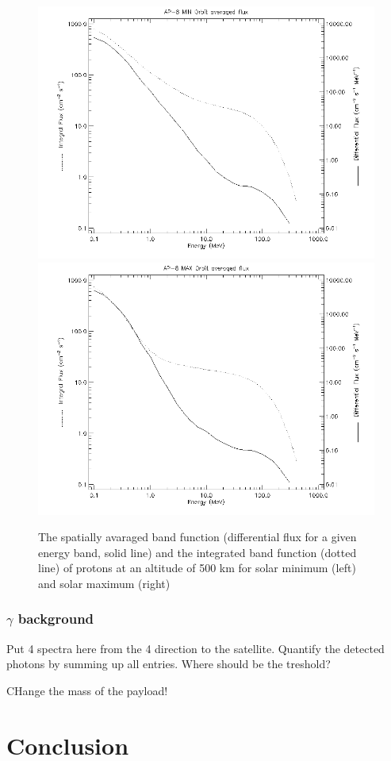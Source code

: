 \documentclass[12pt, a4paper,titlepage]{article}
\numberwithin{equation}{section}
\numberwithin{figure}{section}
\begin{document}
\begin{figure}[htbp]
 \centering %
 \includegraphics[width=.45\textwidth,origin=c,angle=0]{images/alt_500km_AP-8_MIN_averaged_spectra.png}
 \qquad
 \includegraphics[width=.45\textwidth,origin=c]{images/alt_500km_AP-8_MAX_averaged_spectra.png} 
 \caption{\label{fig:band500p} The spatially avaraged band function (differential flux for a given energy band, solid line) and the integrated band function (dotted line) of protons at an altitude of 500 km for solar minimum (left) and solar maximum (right) }
 \end{figure}

\subsubsection{$\gamma$ background}

\pagebreak

Put 4 spectra here from the 4 direction to the satellite. Quantify the detected photons by summing up all entries. Where should be the treshold?

CHange the mass of the payload!

\pagebreak

\section{Conclusion}
\end{document}
